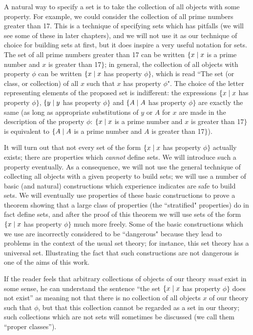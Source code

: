 A natural way to specify a set is to take the collection of
all objects with some property.  For example, we could
consider the 
collection of all prime numbers greater than 17.  This is a technique
of specifying sets which has pitfalls (we will see some of these in
later chapters), and we will not use it as our technique of choice for
building sets at first, but it does inspire a very useful
notation for sets.  The set of all prime numbers greater than 17 can
be written $\{x \mid x$ is a prime number and $x$ is greater than
17$\}$; in general, the collection of all objects with property $\phi$
can be written $\{x \mid x$ has property $\phi\}$, which is read ``The
set (or class, or collection) of all $x$ such that $x$ has property
$\phi$".  The choice of the letter representing elements of the
proposed set is indifferent: the expressions $\{x \mid x$ has property
$\phi\}$, $\{y \mid y$ has property $\phi\}$ and $\{A \mid A$ has
property $\phi\}$ are exactly the same (as long as appropriate
substitutions of $y$ or $A$ for $x$ are made in the description of the
property $\phi$: $\{x \mid x$ is a prime number and $x$ is greater than 17$\}$
is equivalent to $\{A \mid A$ is a prime number and $A$ is greater than
17$\}$).

It will turn out that not every set of the form $\{x \mid x$
has property $\phi\}$ actually exists; there are
properties which {\itshape cannot\/} define sets.  We will introduce such a
property eventually.  As a consequence, we will not use the general
technique of collecting all objects with a given property to build
sets; we will use a number of basic (and natural) constructions which
experience indicates are safe to build sets.  We will eventually use
properties of these basic constructions to prove a theorem showing
that a large class of properties (the
``stratified" properties) do in fact define
sets, and after the proof of this theorem we will use sets of the form
$\{x \mid x$ has property $\phi\}$ much more freely.  Some of the
basic constructions which we use are incorrectly considered to be
``dangerous" because they lead to problems in the context of the
usual set theory; for instance,
this set theory has a universal set.
Illustrating the fact that such constructions are not dangerous is one
of the aims of this work.  

If the reader feels that arbitrary collections of objects of our
theory {\itshape must\/} exist in some sense, he can understand the
sentence ``the set $\{x \mid x$ has property $\phi\}$ does not exist'' as
meaning not that there is no collection of all objects $x$ of our
theory such that $\phi$, but that this collection cannot be regarded as a
set in our theory; such collections which are not sets will sometimes
be discussed (we call them ``proper classes'').



